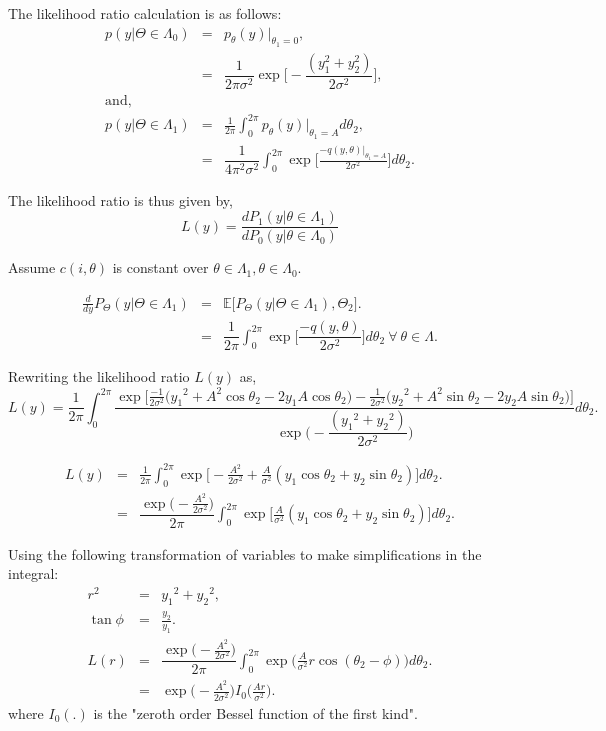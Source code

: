 \documentclass[a4paper,english,12pt]{article}
\begin{document}
\begin{exmp}
The likelihood ratio calculation is as follows:
\begin{eqnarray}
p(y|\Theta \in \Lambda_0) &=& p_\theta(y)|_{\theta_1 = 0},\\
&=& \dfrac{1}{2\pi\sigma^2}\exp\big[-\dfrac{(y_1^2 + y_2^2)}{2\sigma^2}\big],\\
\mbox{and,}\nonumber\\
p(y|\Theta \in \Lambda_1)&=& \frac{1}{2\pi}\int_{0}^{2\pi}p_\theta(y)|_{\theta_1 = A}d\theta_2,\\
&=& \dfrac{1}{4\pi^2\sigma^2}\int_{0}^{2\pi}\exp\big[\frac{-q(y,\theta)|_{\theta_1 = A}}{2\sigma^2}\big]d\theta_2.
\end{eqnarray} 
	
The likelihood ratio is thus given by,
\begin{equation}
L(y) = \frac{dP_1(y| \theta \in \Lambda_1)}{dP_0(y| \theta \in \Lambda_0)}
\end{equation}
	
Assume $c(i,\theta)$ is constant over $\theta \in \Lambda_1, \theta \in \Lambda_0$.
	
\begin{eqnarray}
\frac{d}{dy}P_\Theta(y | \Theta \in \Lambda_1) &=& \mathbb{E}\big[P_\Theta(y | \Theta \in \Lambda_1), \Theta_2]. \\
&=& \dfrac{1}{2\pi}\int_{0}^{2\pi}\exp\Big[\dfrac{-q(y,\theta)}{2\sigma^2}\Big]d\theta_2 ~ \forall ~ \theta \in \Lambda.
\end{eqnarray}
	
Rewriting the likelihood ratio $L(y)$ as,
\begin{equation*}
L(y) = \frac{1}{2\pi}\int_{0}^{2\pi}\dfrac{\exp\Big[\frac{-1}{2{\sigma}^2}\Big({y_1}^2 + A^2{\cos\theta_2}-2y_1A\cos\theta_2\Big)-\frac{1}{2{\sigma}^2}\Big({y_2}^2 + A^2{\sin\theta_2}-2y_2A\sin\theta_2\Big)\Big]}{\exp\Big(-\dfrac{({y_1}^2 + {y_2}^2)}{2{\sigma}^2}\Big)}d\theta_2.
\end{equation*}
	
\begin{eqnarray}
L(y) &=& \frac{1}{2\pi}\int_{0}^{2\pi}\exp\Big[-\frac{A^2}{2{\sigma}^2}+\frac{A}{{\sigma}^2}(y_1\cos\theta_2 + y_2\sin\theta_2)\Big]d\theta_2. \nonumber \\
&=&\dfrac{\exp\big(-\frac{A^2}{2{\sigma}^2}\big)}{2\pi}\int_{0}^{2\pi}\exp\Big[\frac{A}{{\sigma}^2}(y_1\cos\theta_2 + y_2\sin\theta_2)\Big]d\theta_2.
\end{eqnarray}
	
Using the following transformation of variables to make simplifications in the integral:
\begin{eqnarray}
r^2 &=& {y_1}^2 + {y_2}^2,\\
\tan\phi &=& \frac{y_2}{y_1}.\\
L(r) &=& \dfrac{\exp\big(-\frac{A^2}{2\sigma^2}\big)}{2\pi}\int_{0}^{2\pi}\exp\big(\frac{A}{\sigma^2}r\cos(\theta_2 - \phi)\big)d\theta_2.\\
&=& \exp\big(-\frac{A^2}{2\sigma^2}\big)I_0\big(\frac{Ar}{\sigma^2}\big).
\end{eqnarray}
where $I_0(.)$ is the "zeroth order Bessel function of the first kind".
	

\end{exmp}
\end{document}
